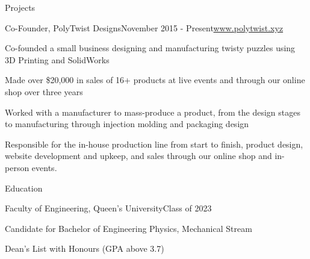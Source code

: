 \documentclass{resume} %
\begin{document}
\begin{rSection}{Projects}

\begin{rSubsection}{Co-Founder, PolyTwist Designs}{November 2015 - Present}{\url{www.polytwist.xyz}}{}
\item Co-founded a small business designing and manufacturing twisty puzzles using 3D Printing and SolidWorks
\item Made over \$20,000 in sales of 16+ products at live events and through our online shop over three years
\item Worked with a manufacturer to mass-produce a product, from the design stages to manufacturing through injection molding and packaging design
\item Responsible for the in-house production line from start to finish, product design, website development and upkeep, and sales through our online shop and in-person events.
\end{rSubsection}


\end{rSection}






\begin{rSection}{Education}

\begin{rSubsection}{Faculty of Engineering, Queen's University}{Class of 2023}{}{}
\item Candidate for Bachelor of Engineering Physics, Mechanical Stream
\item Dean's List with Honours (GPA above 3.7)
\end{rSubsection}
\end{rSection}
\end{document}
